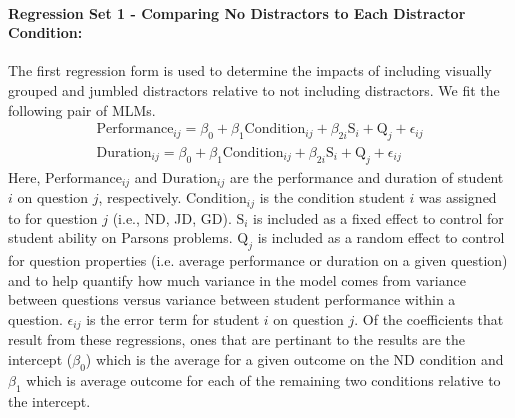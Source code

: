 \documentclass[authorversion,nonacm]{acmart}
\begin{document}
\noindent \paragraph{Regression Set 1 - Comparing No Distractors to Each Distractor Condition:}
The first regression form is used to determine the impacts of including visually grouped  
and jumbled distractors relative to not including distractors. We fit the
following pair of MLMs.
\begin{align*}
  \text{Performance}_{ij} = \beta_0 +  \beta_1\text{Condition}_{ij} + \beta_{2i}\text{S}_{i} + \text{Q}_{j} + \epsilon_{ij}\\
  \text{Duration}_{ij} = \beta_0 + \beta_1\text{Condition}_{ij} + \beta_{2i}\text{S}_{i} + \text{Q}_{j} + \epsilon_{ij} 
\end{align*}
Here, $\text{Performance}_{ij}$ and $\text{Duration}_{ij}$ are the performance
and duration of student $i$ on question $j$, respectively.
$\text{Condition}_{ij}$ is the condition student $i$ was assigned to for
question $j$ (i.e., ND, JD, GD). $\text{S}_{i}$ is included as a fixed effect
to control for student ability on Parsons problems. $\text{Q}_{j}$ is included
as a random effect to control for question properties (i.e. average performance
or duration on a given question) and to help quantify how much variance in the
model comes from variance between questions versus variance between student
performance within a question.  $\epsilon_{ij}$ is the error term for student
$i$ on question $j$.  Of the coefficients that result from these regressions,
ones that are pertinant to the results are the intercept ($\beta_0$) which is
the average for a given outcome on the ND condition and $\beta_1$ which is
average outcome for each of the remaining two conditions relative to the
intercept. 
\end{document}
